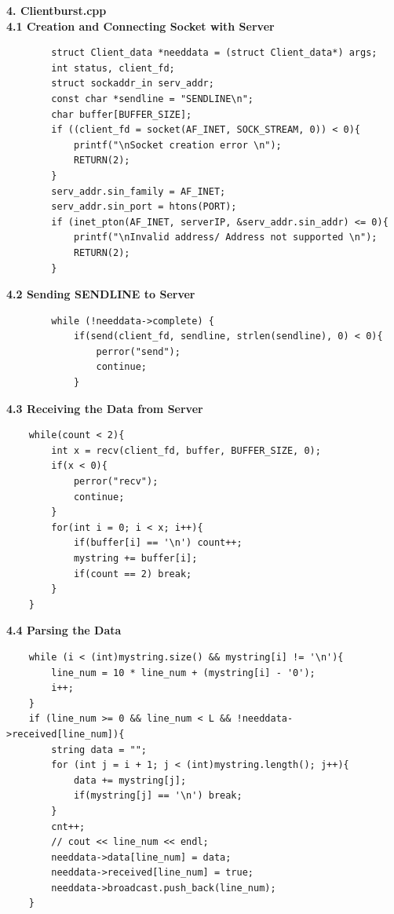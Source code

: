 \documentclass[12pt]{scrartcl}
\begin{document}
\textbf{4. Clientburst.cpp}\\
\textbf{4.1 Creation and Connecting Socket with Server}
\begin{verbatim}
        struct Client_data *needdata = (struct Client_data*) args;
        int status, client_fd;
        struct sockaddr_in serv_addr;
        const char *sendline = "SENDLINE\n";
        char buffer[BUFFER_SIZE];
        if ((client_fd = socket(AF_INET, SOCK_STREAM, 0)) < 0){
            printf("\nSocket creation error \n");
            RETURN(2);
        }
        serv_addr.sin_family = AF_INET;
        serv_addr.sin_port = htons(PORT);
        if (inet_pton(AF_INET, serverIP, &serv_addr.sin_addr) <= 0){
            printf("\nInvalid address/ Address not supported \n");
            RETURN(2);
        }
\end{verbatim}
\textbf{4.2 Sending SENDLINE to Server}
\begin{verbatim}
        while (!needdata->complete) {
            if(send(client_fd, sendline, strlen(sendline), 0) < 0){
                perror("send");
                continue;
            }
\end{verbatim}
\textbf{4.3 Receiving the Data from Server}
\begin{verbatim}
    while(count < 2){
        int x = recv(client_fd, buffer, BUFFER_SIZE, 0);
        if(x < 0){
            perror("recv");
            continue;
        }
        for(int i = 0; i < x; i++){
            if(buffer[i] == '\n') count++;
            mystring += buffer[i];
            if(count == 2) break;
        }
    }
\end{verbatim}
\textbf{4.4 Parsing the Data}
\begin{verbatim}
    while (i < (int)mystring.size() && mystring[i] != '\n'){
        line_num = 10 * line_num + (mystring[i] - '0');
        i++;
    }
    if (line_num >= 0 && line_num < L && !needdata->received[line_num]){
        string data = "";
        for (int j = i + 1; j < (int)mystring.length(); j++){
            data += mystring[j];
            if(mystring[j] == '\n') break;
        }
        cnt++;
        // cout << line_num << endl;
        needdata->data[line_num] = data;
        needdata->received[line_num] = true;
        needdata->broadcast.push_back(line_num);
    }
\end{verbatim}
\end{document}
